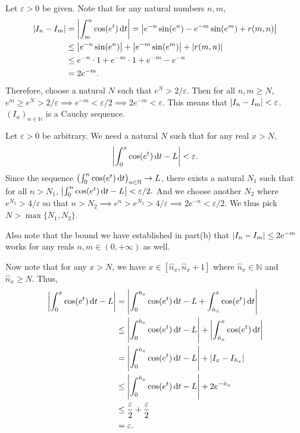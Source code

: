 \documentclass[12pt]{article}
\begin{document}
\begin{fproof}[1(b)]
    Let \(\varepsilon>0\) be given.
    Note that for any natural numbers \(n,m\),
    \begin{align*}
        \left\lvert I_n - I_m \right\rvert &= \left\lvert \int_{m}^{n} \cos(e^t) \mathop{}\!\mathrm{d} t \right\rvert = \left\lvert e^{-n}\sin(e^n) - e^{-m}\sin(e^m) + r(m,n) \right\rvert\\
        & \leq \left\lvert e^{-n}\sin(e^n) \right\rvert + \left\lvert e^{-m}\sin(e^m) \right\rvert + \left\lvert r(m,n) \right\rvert\\
        & \leq e^{-n} \cdot 1 + e^{-m} \cdot 1 + e^{-m} - e^{-n}\\
        & =2e^{-m}.
    \end{align*}
    Therefore, choose a natural \(N\) such that \(e^{N} > 2/\varepsilon\).
    Then for all \(n,m \geq N\),
    \(e^{m} \geq e^{N} > 2/\varepsilon \implies e^{-m} < \varepsilon/2 \implies 2e^{-m} < \varepsilon \).
    This means that \(\left\lvert I_n - I_m \right\rvert < \varepsilon\).
    \((I_n)_{n \in \mathbb{N}}\) is a Cauchy sequence.
\end{fproof}

\begin{fproof}[1(c)]
Let \(\varepsilon > 0\) be arbitrary.
We need a natural \(N\) such that for any real \(x > N\),
\begin{align*}
    \left\lvert \int_{0}^{x} \cos(e^t) \mathop{}\!\mathrm{d} t - L \right\rvert < \varepsilon.
\end{align*}
Since the sequence \(\left( \int_{0}^{n} \cos(e^t) \mathop{}\!\mathrm{d} t \right)_{n \in \mathbb{N}} \to L\), there exists a natural \(N_1\) such that for all \(n > N_1\), \(\left\lvert \int_{0}^{n} \cos(e^t) \mathop{}\!\mathrm{d} t - L \right\rvert < \varepsilon/2.\)
And we choose another \(N_2\) where \(e^{N_2} > 4/\varepsilon\) so that \(n > N_2 \implies e^n > e^{N_2} > 4/\varepsilon \implies 2e^{-n} < \varepsilon/2\).
We thus pick \(N > \max\{N_1, N_2\}\).

Also note that the bound we have established in part(b) that \(\left\lvert I_n - I_m \right\rvert \leq 2e^{-m}\) works for any reals \(n, m \in (0, +\infty)\) as well.

Now note that for any \(x > N\), we have \(x \in [\hat{n}_x, \hat{n}_x+1]\) where \(\hat{n}_x \in \mathbb{N}\) and \(\hat{n}_x \geq N\).
Thus,
\begin{align*}
    \left\lvert \int_{0}^{x} \cos(e^t) \mathop{}\!\mathrm{d} t - L \right\rvert &= \left\lvert \int_{0}^{\hat{n}_x} \cos(e^t) \mathop{}\!\mathrm{d} t - L + \int_{\hat{n}_x}^{x} \cos(e^t) \mathop{}\!\mathrm{d} t \right\rvert\\
    &\leq \left\lvert \int_{0}^{\hat{n}_x} \cos(e^t) \mathop{}\!\mathrm{d} t - L \right\rvert + \left\lvert \int_{\hat{n}_x}^{x} \cos(e^t) \mathop{}\!\mathrm{d} t \right\rvert\\
    & = \left\lvert \int_{0}^{\hat{n}_x} \cos(e^t) \mathop{}\!\mathrm{d} t - L \right\rvert + \left\lvert I_x - I_{\hat{n}_x} \right\rvert \\
    & \leq \left\lvert \int_{0}^{\hat{n}_x} \cos(e^t) \mathop{}\!\mathrm{d} t - L \right\rvert + 2e^{-\hat{n}_x}\\
    & \leq \frac{\varepsilon}{2} + \frac{\varepsilon}{2} \\
    & = \varepsilon.
\end{align*}
\end{fproof}
\newpage
\end{document}
